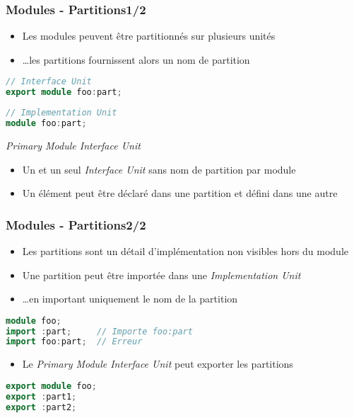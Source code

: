 \documentclass[C++.tex]{subfiles}
\begin{document}
\begin{frame}[fragile]
	\frametitle{Modules - Partitions\titlehfill{}1/2}
	\begin{itemize}
		\item Les modules peuvent être partitionnés sur plusieurs unités
		\item \ldots les partitions fournissent alors un nom de partition
	\end{itemize}

	\begin{lstlisting}[language=C++]
// Interface Unit
export module foo:part;\end{lstlisting}

	\begin{lstlisting}[language=C++]
// Implementation Unit
module foo:part;\end{lstlisting}

	\begin{alertblock}{\textit{Primary Module Interface Unit}}
		\begin{itemize}
			\item Un et un seul \textit{Interface Unit} sans nom de partition par module
		\end{itemize}
	\end{alertblock}

	\begin{itemize}
		\item Un élément peut être déclaré dans une partition et défini dans une autre
	\end{itemize}
\end{frame}

\begin{frame}[fragile]
	\frametitle{Modules - Partitions\titlehfill{}2/2}
	\begin{itemize}
		\item Les partitions sont un détail d'implémentation non visibles hors du module


		\item Une partition peut être importée dans une \textit{Implementation Unit}
		\item \ldots{}en important uniquement le nom de la partition
	\end{itemize}

	\begin{lstlisting}[language=C++]
module foo;
import :part;     // Importe foo:part
import foo:part;  // Erreur\end{lstlisting}

	\begin{itemize}
		\item Le \textit{Primary Module Interface Unit} peut exporter les partitions
	\end{itemize}

	\begin{lstlisting}[language=C++]
export module foo;
export :part1;
export :part2;\end{lstlisting}
\end{frame}
\end{document}
